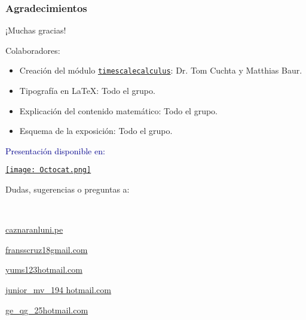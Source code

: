 \begin{frame}
\frametitle{Agradecimientos}
\begin{center}\Large
	¡Muchas gracias!
\end{center}

Colaboradores:

\begin{itemize}
	\item Creación del módulo \href{https://github.com/tomcuchta/timescalecalculus}{\texttt{timescalecalculus}}: Dr. Tom Cuchta y Matthias Baur.
	\item Tipografía en \LaTeX{}: Todo el grupo.
	\item Explicación del contenido matemático: Todo el grupo.
	\item Esquema de la exposición: Todo el grupo.
\end{itemize}
\vfill
\begin{minipage}{0.45\paperwidth}
	\textcolor{DarkBlue}{Presentación disponible en:}
	\begin{center}
		\href{https://github.com/carlosal1015/Real-Analysis-Project}{\texttt{[image: Octocat.png]}}
	\end{center}
\end{minipage}
\hfill
\begin{minipage}{0.45\paperwidth}
	\begin{flushright}
		Dudas, sugerencias o preguntas a:

		\

		\href{mailto:caznaranl@uni.pe}{caznaranl\MVAt uni.pe}
		
		\href{mailto:fransscruz18@gmail.com}{fransscruz18\MVAt gmail.com}
		
		\href{mailto:yums123@hotmail.com}{yums123\MVAt hotmail.com}
		
		\href{mailto:junior_mv_194@hotmail.com}{junior\_mv\_194 \MVAt hotmail.com}
		
		\href{mailto:ge_qg_25@hotmail.com}{ge\_qg\_25\MVAt hotmail.com}
	\end{flushright}
\end{minipage}

\end{frame}